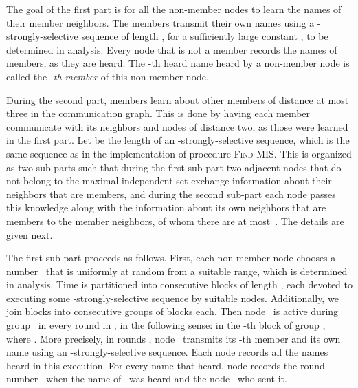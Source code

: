 \documentclass[11pt]{article}
\begin{document}
The goal of the first part is for all the non-member nodes to learn the names of their member neighbors.
The members transmit their own names using a -strongly-selective sequence of length , for a sufficiently large constant , to be determined in analysis.
Every node that is not a member records the names of members, as they are heard.
The -th heard name heard by a non-member node is called the \emph{-th member} of this non-member node.

During the second part, members learn about other members of distance at most three in the communication graph.
This is done by having each member  communicate with its neighbors and nodes of distance two, as those were learned in the first part.
Let  be the length of an -strongly-selective sequence, which is the same sequence as in the implementation of procedure \textsc{Find-MIS}.
This is organized as two sub-parts such that during the first sub-part two adjacent nodes that do not belong to the maximal independent set exchange information about their  neighbors that are members, and during the second sub-part each node passes this knowledge along with the information about its own  neighbors that are members to the member neighbors, of whom there are at most~. 
The details are given next.

The first sub-part proceeds as follows.
First, each non-member node   chooses a number~ that is  uniformly at random from a suitable range, which is determined in analysis.
Time is partitioned into consecutive blocks of length , each devoted to executing some -strongly-selective sequence by suitable nodes.
Additionally, we join blocks into consecutive groups of  blocks each.
Then node~ is active during group~ in every round in , 
in the following sense: in the -th block of group , where .
More precisely, in rounds , node~ transmits its -th member and its own name using an -strongly-selective sequence.
Each node  records all the names heard in this execution.
For every name that  heard, node  records the round number~ when the name of~ was heard and the node~ who sent it.
\end{document}
